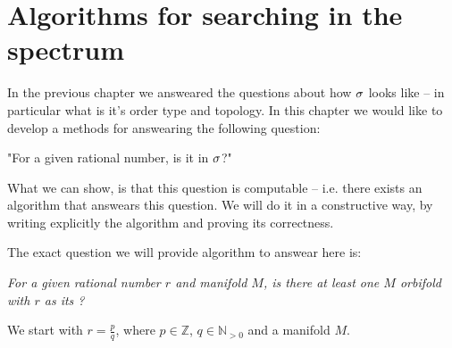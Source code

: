 \chapter{Algorithms for searching in the spectrum}

In the previous chapter we answeared the questions about how ${\sigma}$ looks like -- in particular 
what is it's order type and topology. In this chapter we would like to develop a 
methods for answearing the 
following question: 

"For a given rational number, is it in ${\sigma}$?" 





What we can show, is that this question is computable -- i.e. there exists an algorithm 
that answears this question. 
We will do it in a constructive way, by writing explicitly the algorithm and proving its
correctness.


The exact question we will provide algorithm to answear here is: 

\textit{For a given rational number $r$ and manifold $M$, is there at least one 
$M$ orbifold with $r$ as its \Eoc?}


We start with $r=\frac{p}{q}$, where $p \in \mathbb{Z}$, $q \in \mathbb{N}_{>0}$ and a manifold $M$. 


